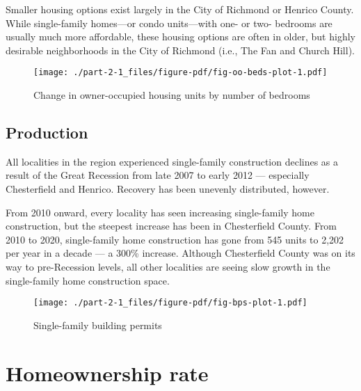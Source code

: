 \documentclass[
  letterpaper,
  DIV=11,
  numbers=noendperiod]{scrreprt}
\begin{document}
Smaller housing options exist largely in the City of Richmond or Henrico
County. While single-family homes---or condo units---with one- or two-
bedrooms are usually much more affordable, these housing options are
often in older, but highly desirable neighborhoods in the City of
Richmond (i.e., The Fan and Church Hill).

\begin{figure}

{\centering \texttt{[image: ./part-2-1\_files/figure-pdf/fig-oo-beds-plot-1.pdf]}

}

\caption{\label{fig-oo-beds-plot}Change in owner-occupied housing units
by number of bedrooms}

\end{figure}

\hypertarget{production}{%
\subsection{Production}\label{production}}

All localities in the region experienced single-family construction
declines as a result of the Great Recession from late 2007 to early 2012
--- especially Chesterfield and Henrico. Recovery has been unevenly
distributed, however.

From 2010 onward, every locality has seen increasing single-family home
construction, but the steepest increase has been in Chesterfield County.
From 2010 to 2020, single-family home construction has gone from 545
units to 2,202 per year in a decade --- a 300\% increase. Although
Chesterfield County was on its way to pre-Recession levels, all other
localities are seeing slow growth in the single-family home construction
space.

\begin{figure}

{\centering \texttt{[image: ./part-2-1\_files/figure-pdf/fig-bps-plot-1.pdf]}

}

\caption{\label{fig-bps-plot}Single-family building permits}

\end{figure}

\hypertarget{homeownership-rate}{%
\section{Homeownership rate}\label{homeownership-rate}}
\end{document}
